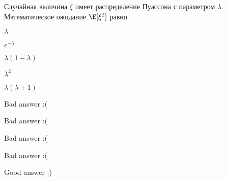 
\begin{question}
Случайная величина \(\xi\) имеет распределение Пуассона с параметром
\(\lambda\). Математическое ожидание \(\E[\xi^2]\) равно
\begin{answerlist}
  \item \(\lambda\)
  \item \(e^{-\lambda}\)
  \item \(\lambda(1 - \lambda)\)
  \item \(\lambda^2\)
  \item \(\lambda(\lambda+1)\)
\end{answerlist}
\end{question}

\begin{solution}
\begin{answerlist}
  \item Bad answer :(
  \item Bad answer :(
  \item Bad answer :(
  \item Bad answer :(
  \item Good answer :)
\end{answerlist}
\end{solution}

